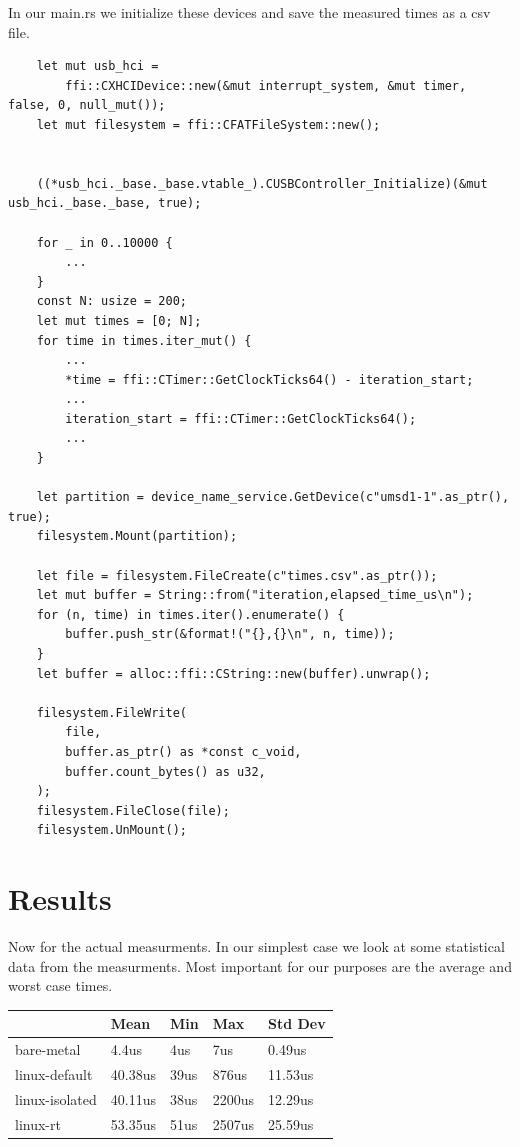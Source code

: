 In our main.rs we initialize these devices and save the measured times as a csv file.
\begin{lstlisting}
    let mut usb_hci =
        ffi::CXHCIDevice::new(&mut interrupt_system, &mut timer, false, 0, null_mut());
    let mut filesystem = ffi::CFATFileSystem::new();


    ((*usb_hci._base._base.vtable_).CUSBController_Initialize)(&mut usb_hci._base._base, true);

    for _ in 0..10000 {
        ...
    }
    const N: usize = 200;
    let mut times = [0; N];
    for time in times.iter_mut() {
        ...
        *time = ffi::CTimer::GetClockTicks64() - iteration_start;
        ...
        iteration_start = ffi::CTimer::GetClockTicks64();
        ...
    }

    let partition = device_name_service.GetDevice(c"umsd1-1".as_ptr(), true);
    filesystem.Mount(partition);

    let file = filesystem.FileCreate(c"times.csv".as_ptr());
    let mut buffer = String::from("iteration,elapsed_time_us\n");
    for (n, time) in times.iter().enumerate() {
        buffer.push_str(&format!("{},{}\n", n, time));
    }
    let buffer = alloc::ffi::CString::new(buffer).unwrap();

    filesystem.FileWrite(
        file,
        buffer.as_ptr() as *const c_void,
        buffer.count_bytes() as u32,
    );
    filesystem.FileClose(file);
    filesystem.UnMount();
\end{lstlisting}

\section{Results}
\label{sec:experiments:results}

Now for the actual measurments.
In our simplest case we look at some statistical data from the measurments.
Most important for our purposes are the average and worst case times.

\begin{table}[h!]
  \label{tab:measurments}
  \begin{tabular}{|l|l|l|l|l|}
    \hline
                   & Mean    & Min  & Max    & Std Dev \\ \hline
    bare-metal     & 4.4us   & 4us  & 7us    & 0.49us  \\ \hline
    linux-default  & 40.38us & 39us & 876us  & 11.53us \\ \hline
    linux-isolated & 40.11us & 38us & 2200us & 12.29us \\ \hline
    linux-rt       & 53.35us & 51us & 2507us & 25.59us \\ \hline
  \end{tabular}
\end{table}

